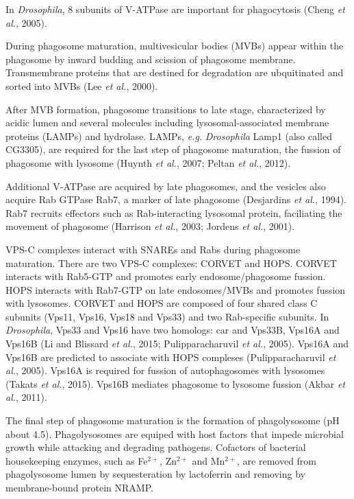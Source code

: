 \documentclass[11pt]{article}
\begin{document}
\begin{sloppypar}
In \textit{Drosophila}, 8 subunits of V-ATPase are important for phagocytosis (Cheng \textit{et al.}, 2005).
\par
During phagosome maturation, multivesicular bodies (MVBs) appear within the phagosome by inward budding and scission of phagosome membrane. 
Transmembrane proteins that are destined for degradation are ubquitinated and sorted into MVBs (Lee \textit{et al.}, 2000). 
\par
After MVB formation, phagosome transitions to late stage, characterized by acidic lumen and several molecules including lysosomal-associated membrane proteins (LAMPs) and hydrolase. 
LAMPs, \textit{e.g.} \textit{Drosophila} Lamp1 (also called CG3305), are required for the last step of phagosome maturation, the fussion of phagosome with lysosome (Huynth \textit{et al.}, 2007; Peltan \textit{et al.}, 2012). 
\par
Additional V-ATPase are acquired by late phagosomes, and the vesicles also acquire Rab GTPase Rab7, a marker of late phagosome (Desjardins \textit{et al.}, 1994). 
Rab7 recruits effectors such as Rab-interacting lysosomal protein, faciliating the movement of phagosome (Harrison \textit{et al.}, 2003; Jordens \textit{et al.}, 2001). 
\par
VPS-C complexes interact with SNAREs and Rabs during phagosome maturation. 
There are two VPS-C complexes: CORVET and HOPS. 
CORVET interacts with Rab5-GTP and promotes early endosome/phagosome fussion. 
HOPS interacts with Rab7-GTP on late endosomes/MVBs and promotes fussion with lysosomes. 
CORVET and HOPS are composed of four shared class C subunits (Vps11, Vps16, Vps18 and Vps33) and two Rab-specific subunits. 
In \textit{Drosophila}, Vps33 and Vps16 have two homologs: car and Vps33B, Vps16A and Vps16B (Li and Blissard \textit{et al.}, 2015; Pulipparacharuvil \textit{et al.}, 2005). 
Vps16A and Vps16B are predicted to associate with HOPS compleses (Pulipparacharuvil \textit{et al.}, 2005). 
Vps16A is required for fussion of autophagosomes with lysosomes (Takats \textit{et al.}, 2015). 
Vps16B mediates phagosome to lysosome fussion (Akbar \textit{et al.}, 2011).
\par
The final step of phagosome maturation is the formation of phagolysosome (pH about 4.5). 
Phagolysosomes are equiped with host factors that impede microbial growth while attacking and degrading pathogens. 
Cofactors of bacterial housekeeping enzymes, such as Fe$^{2+}$, Zn$^{2+}$ and Mn$^{2+}$, are removed from phagolysosome lumen by sequesteration by lactoferrin and removing by membrane-bound protein NRAMP. 

\end{sloppypar}
\end{document}
